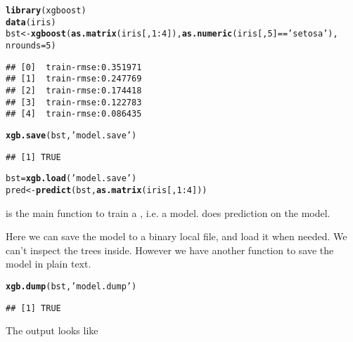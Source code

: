 \documentclass{article}\usepackage[]{graphicx}\usepackage[]{color}
\makeatletter
\newcommand{\hlnum}[1]{\textcolor[rgb]{0.686,0.059,0.569}{#1}}%
\newcommand{\hlstr}[1]{\textcolor[rgb]{0.192,0.494,0.8}{#1}}%
\newcommand{\hlopt}[1]{\textcolor[rgb]{0,0,0}{#1}}%
\newcommand{\hlstd}[1]{\textcolor[rgb]{0.345,0.345,0.345}{#1}}%
\newcommand{\hlkwb}[1]{\textcolor[rgb]{0.69,0.353,0.396}{#1}}%
\newcommand{\hlkwc}[1]{\textcolor[rgb]{0.333,0.667,0.333}{#1}}%
\newcommand{\hlkwd}[1]{\textcolor[rgb]{0.737,0.353,0.396}{\textbf{#1}}}%
\newenvironment{kframe}{%
 \def\at@end@of@kframe{}%
 \ifinner\ifhmode%
  \def\at@end@of@kframe{\end{minipage}}%
  \begin{minipage}{\columnwidth}%
 \fi\fi%
 \def\FrameCommand##1{\hskip\@totalleftmargin \hskip-\fboxsep
 \colorbox{shadecolor}{##1}\hskip-\fboxsep
     \hskip-\linewidth \hskip-\@totalleftmargin \hskip\columnwidth}%
 \MakeFramed {\advance\hsize-\width
   \@totalleftmargin\z@ \linewidth\hsize
   \@setminipage}}%
 {\par\unskip\endMakeFramed%
 \at@end@of@kframe}
\newenvironment{knitrout}{}{} %
\makeatother
\begin{document}
\begin{knitrout}
\color{fgcolor}\begin{kframe}
\begin{alltt}
\hlkwd{library}\hlstd{(xgboost)}
\hlkwd{data}\hlstd{(iris)}
\hlstd{bst} \hlkwb{<-} \hlkwd{xgboost}\hlstd{(}\hlkwd{as.matrix}\hlstd{(iris[,}\hlnum{1}\hlopt{:}\hlnum{4}\hlstd{]),}\hlkwd{as.numeric}\hlstd{(iris[,}\hlnum{5}\hlstd{]}\hlopt{==}\hlstr{'setosa'}\hlstd{),}
               \hlkwc{nrounds} \hlstd{=} \hlnum{5}\hlstd{)}
\end{alltt}
\begin{verbatim}
## [0]	train-rmse:0.351971
## [1]	train-rmse:0.247769
## [2]	train-rmse:0.174418
## [3]	train-rmse:0.122783
## [4]	train-rmse:0.086435
\end{verbatim}
\begin{alltt}
\hlkwd{xgb.save}\hlstd{(bst,} \hlstr{'model.save'}\hlstd{)}
\end{alltt}
\begin{verbatim}
## [1] TRUE
\end{verbatim}
\begin{alltt}
\hlstd{bst} \hlkwb{=} \hlkwd{xgb.load}\hlstd{(}\hlstr{'model.save'}\hlstd{)}
\hlstd{pred} \hlkwb{<-} \hlkwd{predict}\hlstd{(bst,} \hlkwd{as.matrix}\hlstd{(iris[,}\hlnum{1}\hlopt{:}\hlnum{4}\hlstd{]))}
\end{alltt}
\end{kframe}
\end{knitrout}

\verb@xgboost@ is the main function to train a \verb@Booster@, i.e. a model.
\verb@predict@ does prediction on the model.

Here we can save the model to a binary local file, and load it when needed.
We can't inspect the trees inside. However we have another function to save the
model in plain text. 
\begin{knitrout}
\color{fgcolor}\begin{kframe}
\begin{alltt}
\hlkwd{xgb.dump}\hlstd{(bst,} \hlstr{'model.dump'}\hlstd{)}
\end{alltt}
\begin{verbatim}
## [1] TRUE
\end{verbatim}
\end{kframe}
\end{knitrout}

The output looks like 
\end{document}
